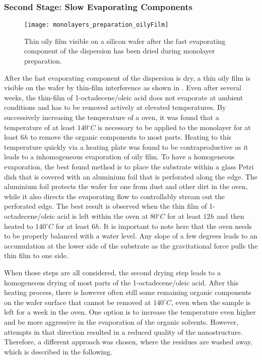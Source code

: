 \documentclass[\main/dresen_thesis.tex]{subfiles}
\begin{document}
  \subsubsection{Second Stage: Slow Evaporating Components}
  \begin{figure}[tb]
    \centering
    \texttt{[image: monolayers\_preparation\_oilyFilm]}
    \caption{\label{fig:monolayers:preparation:dryingConditions:oilyFilm}Thin oily film visible on a silicon wafer after the fast evaporating component of the dispersion has been dried during monolayer preparation.}
  \end{figure}
  After the fast evaporating component of the dispersion is dry, a thin oily film is visible on the wafer by thin-film interference as shown in .
  Even after several weeks, the thin-film of 1-octadecene/oleic acid does not evaporate at ambient conditions and has to be removed actively at elevated temperatures.
  By successively increasing the temperature of a oven, it was found that a temperature of at least $140 \unit{^\circ C}$ is necessary to be applied to the monolayer for at least $6 \unit{h}$ to remove the organic components to most parts.
  Heating to this temperature quickly via a heating plate was found to be contraproductive as it leads to a inhomogeneous evaporation of oily film.
  To have a homogeneous evaporation, the best found method is to place the substrate within a glass Petri dish that is covered with an aluminium foil that is perforated along the edge.
  The aluminium foil protects the wafer for one from dust and other dirt in the oven, while it also directs the evaporating flow to controllably stream out the perforated edge.
  The best result is observed when the thin film of 1-octadecene/oleic acid is left within the oven at $80 \unit{^\circ C}$ for at least $12\unit{h}$ and then heated to $140 \unit{^\circ C}$ for at least $6\unit{h}$.
  It is important to note here that the oven needs to be properly balanced with a water level.
  Any slope of a few degrees leads to an accumulation at the lower side of the substrate as the gravitational force pulls the thin film to one side.

  When those steps are all considered, the second drying step leads to a homogeneous drying of most parts of the 1-octadecene/oleic acid.
  After this heating process, there is however often still some remaining organic components on the wafer surface that cannot be removed at $140 ^\circ C$, even when the sample is left for a week in the oven.
  One option is to increase the temperature even higher and be more aggressive in the evaporation of the organic solvents.
  However, attempts in that direction resulted in a reduced quality of the nanostructure.
  Therefore, a different approach was chosen, where the residues are washed away, which is described in the following.
\end{document}
